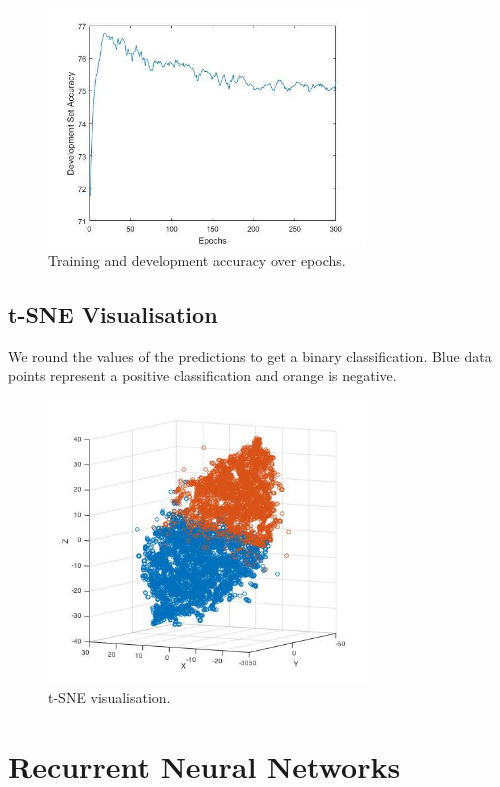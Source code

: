 \documentclass{article} %
\begin{document}
\begin{figure}[H]
\centering
\includegraphics[width=0.75\textwidth]{graphics/devaccuracy.jpg}
\caption{Training and development accuracy over epochs.}
\end{figure}

\subsection{t-SNE Visualisation}

We round the values of the predictions to get a binary classification. Blue data points represent a positive classification and orange is negative.

\begin{figure}[H]
\centering
\includegraphics[width=0.75\textwidth]{graphics/tsneplot.jpg}
\caption{t-SNE visualisation.}
\end{figure}

\section{Recurrent Neural Networks}
\end{document}
